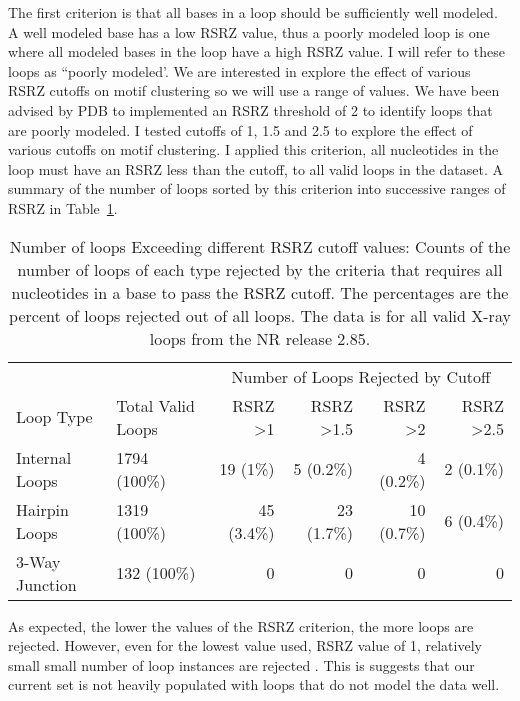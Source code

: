 The first criterion is that all bases in a loop should be sufficiently well
modeled. A well modeled base has a low RSRZ value, thus a poorly modeled loop is
one where all modeled bases in the loop have a high RSRZ value. I will refer to
these loops as ``poorly modeled’. We are interested in explore the effect of
various RSRZ cutoffs on motif clustering so we will use a range of values. We
have been advised by PDB to implemented an RSRZ threshold of 2 to identify loops
that are poorly modeled. I tested cutoffs of 1, 1.5 and 2.5 to explore the
effect of various cutoffs on motif clustering. I applied this criterion, all
nucleotides in the loop must have an RSRZ less than the cutoff, to all valid
loops in the dataset. A summary of the number of loops sorted by this criterion
into successive ranges of RSRZ in Table~\ref{tab:cutoffs-reject-summary}.

\begin{table}
  \begin{tabular}{llrrrr}
    \toprule
              &                   & \multicolumn{4}{c}{Number of Loops Rejected by Cutoff} \\
    Loop Type & Total Valid Loops & RSRZ \textgreater 1  & RSRZ \textgreater 1.5 & RSRZ \textgreater 2 & RSRZ \textgreater 2.5 \\
    \midrule
    Internal Loops & 1794 (100\%) & 19 (1\%)   & 5 (0.2\%)  & 4 (0.2\%)  & 2 (0.1\%) \\
    Hairpin Loops  & 1319 (100\%) & 45 (3.4\%) & 23 (1.7\%) & 10 (0.7\%) & 6 (0.4\%) \\
    3-Way Junction & 132 (100\%)  & 0          & 0          & 0          & 0 \\
    \bottomrule
  \end{tabular}
  \caption{Number of loops Exceeding different RSRZ cutoff values: Counts of the
    number of loops of each type rejected by the criteria that requires all
    nucleotides in a base to pass the RSRZ cutoff. The percentages are the
    percent of loops rejected out of all loops. The data is for all valid X-ray
  loops from the NR release 2.85.}
  \label{tab:cutoffs-reject-summary}
\end{table}

As expected, the lower the values of the RSRZ criterion, the more loops are
rejected. However, even for the lowest value used, RSRZ value of 1, relatively
small small number of loop instances are rejected . This is suggests that our
current set is not heavily populated with loops that do not model the data well.

